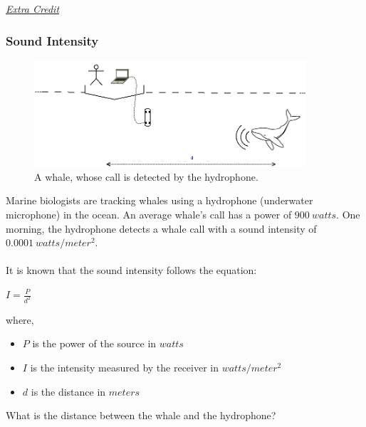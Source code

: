 \documentclass{hw}
\begin{document}
\newpage
\uline{\textit{Extra Credit}}
\subsubsection*{\normalsize Sound Intensity}
\begin{figure}[h]
    \centering
    \includegraphics[width=0.9\textwidth]{dia/radicals-whale.png}
    \caption{A whale, whose call is detected by the hydrophone.}
    \label{fig:whale}
\end{figure}

Marine biologists are tracking whales using a hydrophone (underwater microphone) in the ocean.
An average whale’s call has a power of $900 \: watts$.
One morning, the hydrophone detects a whale call with a sound intensity of $0.0001 \: watts/meter^2$. \\
\\
It is known that the sound intensity follows the equation:

{\centering
$I = \frac{P}{d^2}$
\par}

where,
\begin{itemize}
    \item $P$ is the power of the source in $watts$
    \item $I$ is the intensity measured by the receiver in $watts/meter^2$
    \item $d$ is the distance in $meters$
\end{itemize}
\bigskip
What is the distance between the whale and the hydrophone?

\end{document}
